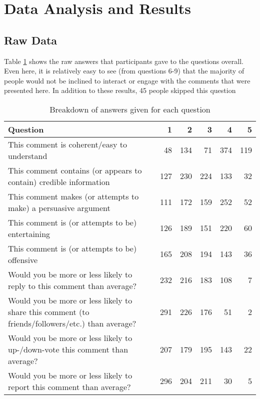 \section{Data Analysis and Results}

\subsection{Raw Data}

Table \ref{table:perception:breakdown} shows the raw answers that participants gave to the questions overall. Even here, it is relatively easy to see (from questions 6-9) that the majority of people would not be inclined to interact or engage with the comments that were presented here. In addition to these results, 45 people skipped this question

\begin{table}
\centering
\caption{Breakdown of answers given for each question}
\label{table:perception:breakdown}
\begin{tabular}{ p{6cm} | r | r | r | r | r }
\textbf{Question} & \textbf{1} &  \textbf{2} &  \textbf{3} &  \textbf{4} &  \textbf{5}\\
\hline
This comment is coherent/easy to understand  &  48 & 134 & 71 & 374 & 119 \\
\hline
This comment contains (or appears to contain) credible information  &  127 & 230 & 224 & 133 & 32 \\
\hline
This comment makes (or attempts to make) a persuasive argument  &  111 & 172 & 159 & 252 & 52 \\
\hline
This comment is (or attempts to be) entertaining  &  126 & 189 & 151 & 220 & 60 \\
\hline
This comment is (or attempts to be) offensive  &  165 & 208 & 194 & 143 & 36 \\
\hline
Would you be more or less likely to reply to this comment than average?  &  232 & 216 & 183 & 108 & 7 \\
\hline
Would you be more or less likely to share this comment (to friends/followers/etc.) than average?  &  291 & 226 & 176 & 51 & 2 \\
\hline
Would you be more or less likely to up-/down-vote this comment than average?  &  207 & 179 & 195 & 143 & 22 \\
\hline
Would you be more or less likely to report this comment than average?  &  296 & 204 & 211 & 30 & 5 \\
\end{tabular}
\end{table}



